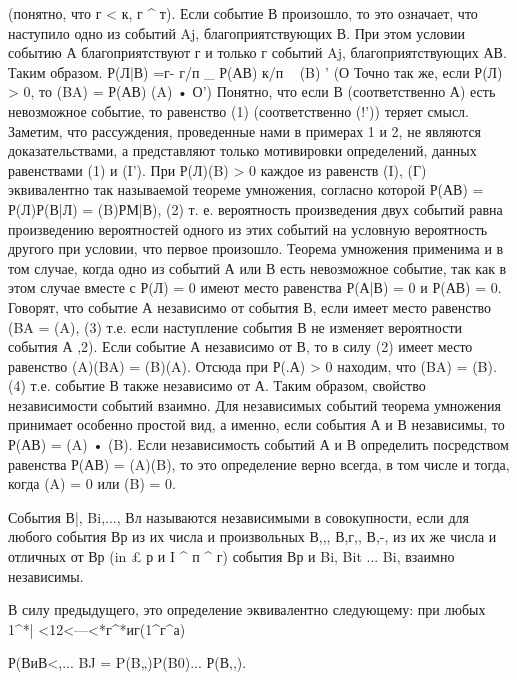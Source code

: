 {(понятно, что г < к, г ^ т). Если событие В произошло, то это означает, что наступило одно из событий Aj, благоприятствующих В. При этом условии событию А благоприятствуют г и только г событий Aj, благоприятствующих АВ. Таким образом.
Р(Л|В) =г-
г/п _ Р(АВ) к/п ~ \bbP(B) '
(О
Точно так же, если Р(Л) > 0, то
\bbP(B\setminus A) =
Р(АВ) \bbP(A) •
О')
Понятно, что если В (соответственно А) есть невозможное событие, то равенство (1) (соответственно (!')) теряет смысл.
Заметим, что рассуждения, проведенные нами в примерах 1 и 2, не являются доказательствами, а представляют только мотивировки определений, данных равенствами (1) и (I').
При Р(Л)\bbP(B) > 0 каждое из равенств (I), (Г) эквивалентно так называемой теореме умножения, согласно которой
Р(АВ) = Р(Л)Р(В|Л) = \bbP(B)РМ|В),
(2)
т. е. вероятность произведения двух событий равна произведению вероятностей одного из этих событий на условную вероятность другого при условии, что первое произошло.
Теорема умножения применима и в том случае, когда одно из событий А или В есть невозможное событие, так как в этом случае вместе с Р(Л) = 0 имеют место равенства Р(А|В) = 0 и Р(АВ) = 0.
Говорят, что событие А независимо от события В, если имеет место равенство
\bbP(B\setminus A = \bbP(A),	(3)
т.е. если наступление события В не изменяет вероятности события А ,2). Если событие А независимо от В, то в силу (2) имеет место равенство
\bbP(A)\bbP(B\setminus A) = \bbP(B)\bbP(A).
Отсюда при Р(.А) > 0 находим, что
\bbP(B\setminus A) = \bbP(B).	(4)
т.е. событие В также независимо от А. Таким образом, свойство независимости событий взаимно.
Для независимых событий теорема умножения принимает особенно простой вид, а именно, если события А и В независимы, то
Р(АВ) = \bbP(A) • \bbP(B).
Если независимость событий А и В определить посредством равенства
Р(АВ) = \bbP(A)\bbP(B),
то это определение верно всегда, в том числе и тогда, когда \bbP(A) = 0 или \bbP(B) = 0.

События В|, Bi,..., Вл называются независимыми в совокупности, если для любого события Вр из их числа и произвольных В,,, В,г,, В,-, из их же числа и отличных от Вр (in £ р и I ^ п ^ г) события Вр и Bi, Bit ... Bi, взаимно независимы.

В силу предыдущего, это определение эквивалентно следующему: при любых 1^*| <12<---<*г^*иг(1^г^а)

Р(ВиВ<,... BJ = P(B„)P(B0)... Р(В,,).

}
